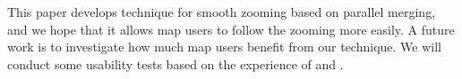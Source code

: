 \documentclass[]{interact}
\begin{document}
This paper develops technique for smooth zooming based on parallel merging,
and we hope that it allows map users to follow the zooming more easily.
A future work is to investigate 
how much map users benefit from our technique.
We will conduct some usability tests based on the experience of
\citet[]{Suba2017Thesis} and \citet{Midtbo2007}.












\end{document}
